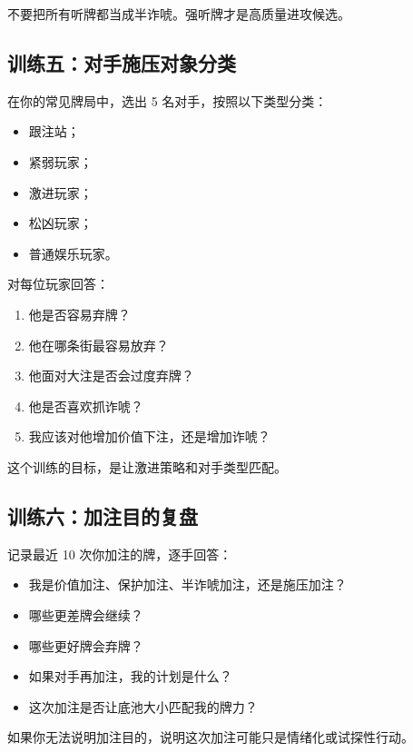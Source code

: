 不要把所有听牌都当成半诈唬。强听牌才是高质量进攻候选。

\subsection*{训练五：对手施压对象分类}

在你的常见牌局中，选出 5 名对手，按照以下类型分类：

\begin{itemize}
\item 跟注站；
\item 紧弱玩家；
\item 激进玩家；
\item 松凶玩家；
\item 普通娱乐玩家。
\end{itemize}

对每位玩家回答：

\begin{enumerate}
\item 他是否容易弃牌？
\item 他在哪条街最容易放弃？
\item 他面对大注是否会过度弃牌？
\item 他是否喜欢抓诈唬？
\item 我应该对他增加价值下注，还是增加诈唬？
\end{enumerate}

这个训练的目标，是让激进策略和对手类型匹配。

\subsection*{训练六：加注目的复盘}

记录最近 10 次你加注的牌，逐手回答：

\begin{itemize}
\item 我是价值加注、保护加注、半诈唬加注，还是施压加注？
\item 哪些更差牌会继续？
\item 哪些更好牌会弃牌？
\item 如果对手再加注，我的计划是什么？
\item 这次加注是否让底池大小匹配我的牌力？
\end{itemize}

如果你无法说明加注目的，说明这次加注可能只是情绪化或试探性行动。
